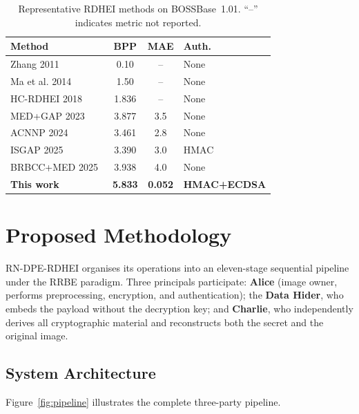 \documentclass[runningheads]{llncs}
\begin{document}
\begin{table}[t]
\centering
\caption{Representative RDHEI methods on BOSSBase~1.01.
``--'' indicates metric not reported.}
\label{tab:related}
\begin{tabular}{@{}lccl@{}}
\toprule
\textbf{Method} & \textbf{BPP} & \textbf{MAE} & \textbf{Auth.}\\
\midrule
Zhang 2011~\cite{ref1}       & 0.10  & --   & None\\
Ma et al. 2014~\cite{ref2}   & 1.50  & --   & None\\
HC-RDHEI 2018~\cite{ref9}    & 1.836 & --   & None\\
MED+GAP 2023~\cite{ref3}     & 3.877 & 3.5  & None\\
ACNNP 2024~\cite{ref4}       & 3.461 & 2.8  & None\\
ISGAP 2025~\cite{ref5}       & 3.390 & 3.0  & HMAC\\
BRBCC+MED 2025~\cite{ref6}   & 3.938 & 4.0  & None\\
\textbf{This work}           & \textbf{5.833} & \textbf{0.052} & \textbf{HMAC+ECDSA}\\
\bottomrule
\end{tabular}
\end{table}

\section{Proposed Methodology}
\label{sec:methodology}

RN-DPE-RDHEI organises its operations into an eleven-stage
sequential pipeline under the RRBE paradigm. Three principals
participate: \textbf{Alice} (image owner, performs
preprocessing, encryption, and authentication); the
\textbf{Data Hider}, who embeds the payload without the
decryption key; and \textbf{Charlie}, who independently
derives all cryptographic material and reconstructs both the
secret and the original image.

\subsection{System Architecture}

Figure~\ref{fig:pipeline} illustrates the complete three-party
pipeline.
\end{document}
